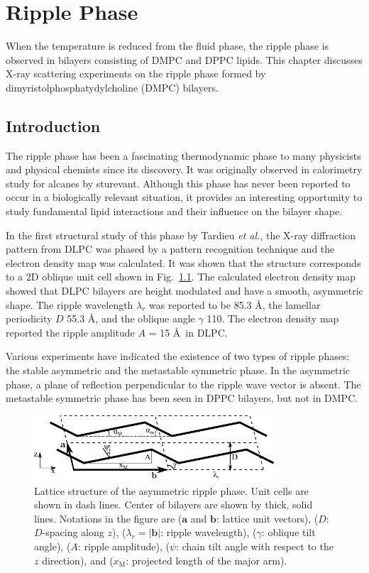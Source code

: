 \chapter{Ripple Phase}\label{chap:ripple}
When the temperature is reduced from the fluid phase, 
the ripple phase is observed in bilayers consisting of DMPC and DPPC lipids.
This chapter discusses X-ray scattering experiments on the ripple phase 
formed by dimyristolphosphatydylcholine (DMPC) bilayers. 

\section{Introduction}\label{sec:ripple_introduction}
The ripple phase has been a fascinating thermodynamic phase to many physicists 
and physical chemists since its discovery. It was originally observed in 
calorimetry study for alcanes by sturevant. Although this phase has never been reported to 
occur in a biologically relevant situation, it provides an interesting opportunity
to study fundamental lipid interactions and their influence on the bilayer 
shape. 

In the first structural study of this phase by Tardieu \textit{et al.},
the X-ray diffraction pattern from DLPC was phased by a pattern recognition
technique and the electron density map was calculated. It was shown that the structure
corresponds to a 2D oblique unit cell shown in Fig.~\ref{fig:unit_cell}.
The calculated 
electron density map showed that DLPC bilayers are height modulated
and have a smooth, asymmetric shape. 
The ripple wavelength $\lambda_r$ was reported to be 85.3 \AA, 
the lamellar periodicity $D$ 55.3 \AA, and the oblique angle
$\gamma$ 110\textdegree. 
The electron density map reported the ripple amplitude $A$ = 15 \AA\ in DLPC.

Various experiments have indicated the existence of two types of ripple phases:
the stable asymmetric and the metastable symmetric phase. In the asymmetric
phase, a plane of reflection perpendicular to the ripple wave vector is 
absent. The metastable symmetric phase has been seen in DPPC bilayers, but not
in DMPC.

\begin{figure}[htbp]
  \centering
  \includegraphics[width=0.8\textwidth]{figures/ripple/unit_cell}
  \caption{Lattice structure of the asymmetric ripple phase. Unit cells are shown in
  dash lines. Center of bilayers are shown by thick, solid lines. Notations 
  in the figure are ($\mathbf{a}$ and $\mathbf{b}$: lattice unit vectors),
  ($D$: $D$-spacing along $z$), ($\lambda_r=|\mathbf{b}|$: ripple wavelength), 
  ($\gamma$: oblique tilt angle), ($A$: ripple amplitude),
  ($\psi$: chain tilt angle with respect to the $z$ direction),
  and ($x_\textrm{M}$: projected length of the major arm).}
  \label{fig:unit_cell}
\end{figure}

